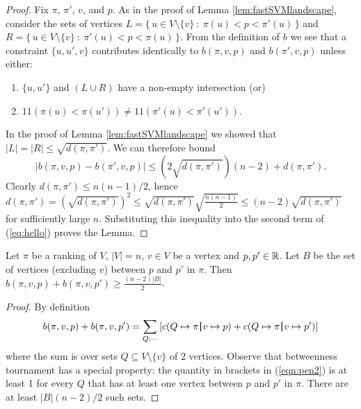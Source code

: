 \documentclass[envcountsame,oribibl]{llncs}
\newcommand{\oneone}{1\!\!1}
\newcommand{\one}[1]{\oneone\left(#1\right)}
\newcommand{\set}[1]{\{#1\}}                        \newcommand{\setof}[2]{\{\,{#1}\::\:{#2}\,\}}        \newcommand{\groupFrac}[2]{\left(\frac{#1}{#2}\right)}
\newcommand{\sm}{\setminus} \newcommand{\compl}[1]{\overline{#1}}                \newcommand{\floor}[1]{\left\lfloor #1 \right\rfloor}
\newcommand{\bp}{\,\rule[-0.22em]{0.08em}{1em}\,}
\begin{document}
\begin{proof}
Fix $\pi$, $\pi'$, $v$,  and $p$. 
As in the proof of Lemma \ref{lem:fastSVMlandscape}, consider the sets of vertices $L=\setof{u \in V \sm \set{v}}{\pi(u)<p<\pi'(u)}$ and $R=\setof{u \in V \sm \set{v}}{\pi'(u)<p<\pi(u)}$.
From the definition of $b$ we see that a constraint $\set{u,u',v}$ contributes identically to $b(\pi, v, p)$ and $b(\pi', v, p)$ unless either:
\begin{enumerate}
\item $\set{u,u'}$ and $(L \cup R)$ have a non-empty intersection (or)
\item $\one{\pi(u) < \pi(u')} \ne \one{\pi'(u) < \pi'(u')}$.
\end{enumerate}

In the proof of Lemma \ref{lem:fastSVMlandscape} we showed that $|L|=|R|\le \sqrt{d(\pi,\pi')}$.
We can therefore bound
\begin{equation}
|b(\pi, v, p) - b(\pi', v, p)| \le (2 \sqrt{d(\pi,\pi')})(n-2) + d(\pi,\pi') \label{eq:hello}
.\end{equation}
Clearly $d(\pi,\pi') \le n(n-1)/2$, hence $d(\pi,\pi') =(\sqrt{d(\pi,\pi')})^2 \le \sqrt{d(\pi,\pi')} \sqrt{\frac{n(n-1)}{2}} \le (n-2)\sqrt{d(\pi,\pi')}$ for sufficiently large $n$.  Substituting this inequality into the second term of (\ref{eq:hello}) proves the Lemma.
\end{proof}


\begin{lemma}\label{lem:fragile} Let $\pi$ be a ranking of $V$, $|V|=n$, $v\in V$ be a vertex and $p,p' \in \mathbb{R}$.
Let $B$ be the set of vertices (excluding $v$) between $p$ and $p'$ in $\pi$. 
Then
$b(\pi, v, p) + b(\pi, v, p') \ge \frac{(n-2)|B|}{2}$. 
\end{lemma}

\begin{proof}
By definition
\begin{equation}
b(\pi, v, p) + b(\pi, v, p') = \sum_{Q : \cdots} \left[ c(Q \mapsto \pi \bp v \mapsto p)+c(Q \mapsto \pi \bp v \mapsto p') \right] \label{eqn:pen2}
\end{equation}
where the sum is over sets $Q \subseteq V \sm \set{v}$ of $2$ vertices. Observe that betweenness tournament has a special property: the quantity in brackets in (\ref{eqn:pen2}) is at least 1 for every $Q$ that has at least one vertex between $p$ and $p'$ in $\pi$. There are at least $|B| (n-2)/2$ such sets.
\end{proof}
\end{document}
